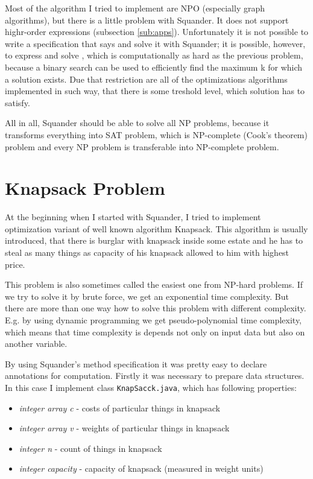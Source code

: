 \documentclass[11pt,twoside,a4paper]{book}
\begin{document}
Most of the algorithm I tried to implement are NPO (especially graph
algorithms), but there is a little problem with Squander. It does not support
highr-order expressions (subsection \ref{sub:apps}). Unfortunately it is not
possible to write a specification that says  and solve it with
Squander; it is possible, however, to express and solve , which is computationally as hard as the previous
problem, because a binary search can be used to efficiently find the maximum k
for which a solution exists. Due that restriction are all of the optimizations
algorithms implemented in such way, that there is some treshold level, which
solution has to satisfy.


All in all, Squander should be able to solve all NP problems, because it
transforms everything into SAT problem, which is NP-complete (Cook's theorem)
problem and every NP problem is transferable into NP-complete problem.
\section{Knapsack Problem}
At the beginning when I started  with Squander, I tried to
implement optimization variant of well known algorithm Knapsack. This algorithm
is usually introduced, that there is burglar with knapsack inside some estate and he has to steal
as many things as capacity of his knapsack allowed to him with highest price. 

This problem is also sometimes called the easiest one from NP-hard problems. If
we try to solve it by brute force, we get an exponential time complexity. But
there are more than one way how to solve this problem with different complexity.
E.g. by using dynamic programming we get pseudo-polynomial time complexity,
which means that time complexity is depends not only on input data but also on
another variable.

By using Squander's method specification it was pretty easy to declare
annotations for computation. Firstly it was necessary to prepare data
structures. In this case I implement class \verb|KnapSacck.java|, which has
following properties:

\begin{itemize}
  \item \textit{integer array c} - costs of particular things in knapsack
  \item \textit{integer array v} - weights of particular things in
  knapsack
  \item \textit{integer n} - count of things in knapsack
  \item \textit{integer capacity} - capacity of knapsack (measured in weight
  units)
\end{itemize}
\end{document}
